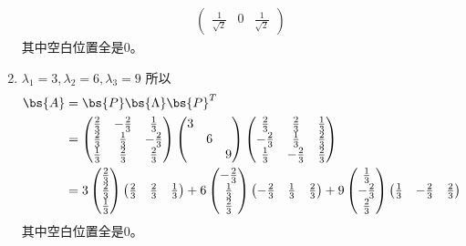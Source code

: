 \documentclass[12pt, a4paper, oneside, UTF8]{ctexbook}
\begin{document}
\begin{solution}
\begin{enumerate}[label=(\arabic*)]
\begin{align*}
\begin{pmatrix}
                \frac{1}{\sqrt{2}} & 0&\frac{1}{\sqrt{2}} 
            \end{pmatrix}
        \end{align*}
        其中空白位置全是$0$。
        \item $\lambda_1=3,\lambda_2=6,\lambda_3=9$
        所以
        \begin{align*}
            \bs{A}&=\bs{P}\bs{\Lambda}\bs{P}^T\\
            &=\begin{pmatrix}
                \frac{2}{3} & -\frac{2}{3} &\frac{1}{3} \\
                \frac{2}{3} & \frac{1}{3}& -\frac{2}{3}\\
                \frac{1}{3} & \frac{2}{3} &\frac{2}{3}
            \end{pmatrix}
            \begin{pmatrix}
                3 & & \\
                & 6& \\
                & & 9
            \end{pmatrix}
            \begin{pmatrix}
                \frac{2}{3} &\frac{2}{3}&\frac{1}{3} \\
                -\frac{2}{3} & \frac{1}{3}&\frac{2}{3}\\
                \frac{1}{3} & -\frac{2}{3}& \frac{2}{3}
            \end{pmatrix}\\
            &=3\begin{pmatrix}
                \frac{2}{3}  \\
                \frac{2}{3} \\
                \frac{1}{3} 
            \end{pmatrix}\begin{pmatrix}
                \frac{2}{3} & \frac{2}{3} &\frac{1}{3} 
            \end{pmatrix}+6\begin{pmatrix}
                -\frac{2}{3}\\
                \frac{1}{3}\\
                \frac{2}{3}
            \end{pmatrix}\begin{pmatrix}
                -\frac{2}{3} & \frac{1}{3}& \frac{2}{3}
            \end{pmatrix}+9\begin{pmatrix}
                \frac{1}{3} \\
                -\frac{2}{3}\\
                \frac{2}{3}
            \end{pmatrix}\begin{pmatrix}
                \frac{1}{3} & -\frac{2}{3}&\frac{2}{3}
            \end{pmatrix}
        \end{align*}
        其中空白位置全是$0$。
    \end{enumerate}
\end{solution}
\end{document}
